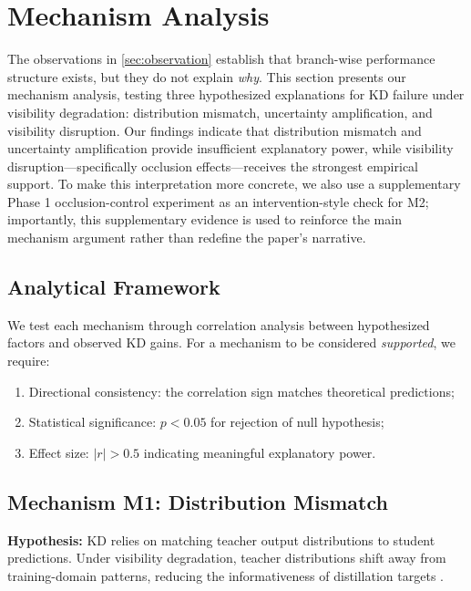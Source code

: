 \section{Mechanism Analysis}
\label{sec:mechanism}

The observations in \cref{sec:observation} establish that branch-wise performance structure exists, but they do not explain \emph{why}. This section presents our mechanism analysis, testing three hypothesized explanations for KD failure under visibility degradation: distribution mismatch, uncertainty amplification, and visibility disruption. Our findings indicate that distribution mismatch and uncertainty amplification provide insufficient explanatory power, while visibility disruption---specifically occlusion effects---receives the strongest empirical support. To make this interpretation more concrete, we also use a supplementary Phase 1 occlusion-control experiment as an intervention-style check for M2; importantly, this supplementary evidence is used to reinforce the main mechanism argument rather than redefine the paper's narrative.

\subsection{Analytical Framework}

We test each mechanism through correlation analysis between hypothesized factors and observed KD gains. For a mechanism to be considered \emph{supported}, we require:
\begin{enumerate}
    \item Directional consistency: the correlation sign matches theoretical predictions;
    \item Statistical significance: $p < 0.05$ for rejection of null hypothesis;
    \item Effect size: $|r| > 0.5$ indicating meaningful explanatory power.
\end{enumerate}

\subsection{Mechanism M1: Distribution Mismatch}

\textbf{Hypothesis:} KD relies on matching teacher output distributions to student predictions. Under visibility degradation, teacher distributions shift away from training-domain patterns, reducing the informativeness of distillation targets \cite{wang2020cross}.

